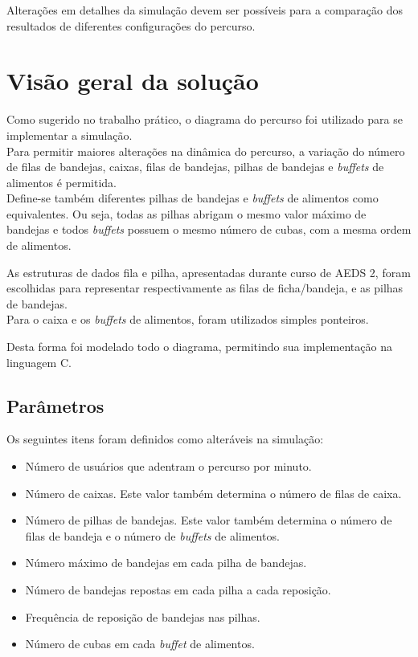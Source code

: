 \documentclass{article}
\begin{document}
Alterações em detalhes da simulação devem ser possíveis para a comparação dos resultados de diferentes configurações do percurso.


\section{Visão geral da solução}
Como sugerido no trabalho prático, o diagrama do percurso foi utilizado para se implementar a simulação.\\
Para permitir maiores alterações na dinâmica do percurso, a variação do número de filas de bandejas, caixas, filas de bandejas, pilhas de bandejas e \textit{buffets} de alimentos é permitida.\\
Define-se também diferentes pilhas de bandejas e \textit{buffets} de alimentos como equivalentes. Ou seja, todas as pilhas abrigam o mesmo valor máximo de bandejas e todos \textit{buffets} possuem o mesmo número de cubas, com a mesma ordem de alimentos.

As estruturas de dados fila e pilha, apresentadas durante curso de AEDS 2, foram escolhidas para representar respectivamente as filas de ficha/bandeja, e as pilhas de bandejas.\\
Para o caixa e os \textit{buffets} de alimentos, foram utilizados simples ponteiros.

Desta forma foi modelado todo o diagrama, permitindo sua implementação na linguagem C.

\subsection{Parâmetros}
\label{ssec:params}
Os seguintes itens foram definidos como alteráveis na simulação:
\begin{itemize}
  \setlength\itemsep{2px}
  \item Número de usuários que adentram o percurso por minuto.
  \item Número de caixas. Este valor também determina o número de filas de caixa.
  \item Número de pilhas de bandejas. Este valor também determina o número de filas de bandeja e o número de \textit{buffets} de alimentos.
  \item Número máximo de bandejas em cada pilha de bandejas.
  \item Número de bandejas repostas em cada pilha a cada reposição.
  \item Frequência de reposição de bandejas nas pilhas.
  \item Número de cubas em cada \textit{buffet} de alimentos.
\end{itemize}
\end{document}
